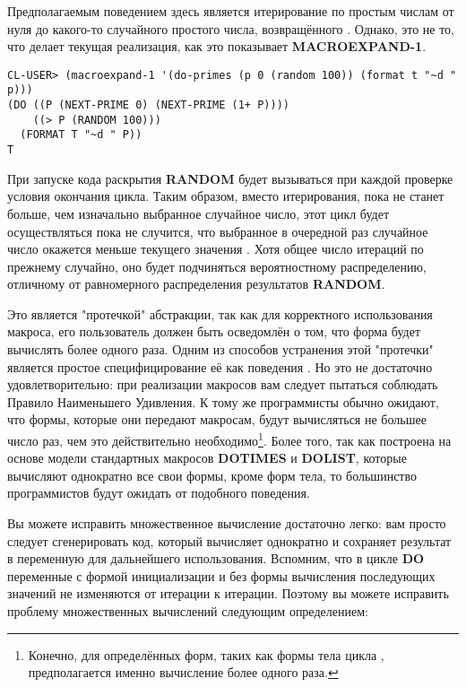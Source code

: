 Предполагаемым поведением здесь является итерирование по простым числам от нуля до
какого-то случайного простого числа, возвращённого . Однако, это не то,
что делает текущая реализация, как это показывает \textbf{MACROEXPAND-1}.

\begin{lstlisting}
CL-USER> (macroexpand-1 '(do-primes (p 0 (random 100)) (format t "~d " p)))
(DO ((P (NEXT-PRIME 0) (NEXT-PRIME (1+ P))))
    ((> P (RANDOM 100)))
  (FORMAT T "~d " P))
T
\end{lstlisting}

При запуске кода раскрытия \textbf{RANDOM} будет вызываться при каждой проверке условия
окончания цикла. Таким образом, вместо итерирования, пока  не станет больше, чем
изначально выбранное случайное число, этот цикл будет осуществляться пока не случится, что
выбранное в очередной раз случайное число окажется меньше текущего значения . Хотя
общее число итераций по прежнему случайно, оно будет подчиняться вероятностному
распределению, отличному от равномерного распределения результатов \textbf{RANDOM}.

Это является "протечкой" абстракции, так как для корректного использования макроса, его
пользователь должен быть осведомлён о том, что форма  будет вычислять более
одного раза. Одним из способов устранения этой "протечки" является простое
специфицирование её как поведения . Но это не достаточно
удовлетворительно: при реализации макросов вам следует пытаться соблюдать Правило
Наименьшего Удивления. К тому же программисты обычно ожидают, что формы, которые они
передают макросам, будут вычисляться не большее число раз, чем это действительно
необходимо\footnote{Конечно, для определённых форм, таких как формы тела цикла
  , предполагается именно вычисление более одного раза.}. Более того, так
как  построена на основе модели стандартных макросов \textbf{DOTIMES} и
\textbf{DOLIST}, которые вычисляют однократно все свои формы, кроме форм тела, то
большинство программистов будут ожидать от  подобного поведения.

Вы можете исправить множественное вычисление достаточно легко: вам просто следует
сгенерировать код, который вычисляет  однократно и сохраняет результат в
переменную для дальнейшего использования. Вспомним, что в цикле \textbf{DO} переменные с
формой инициализации и без формы вычисления последующих значений не изменяются от итерации
к итерации. Поэтому вы можете исправить проблему множественных вычислений следующим
определением:

